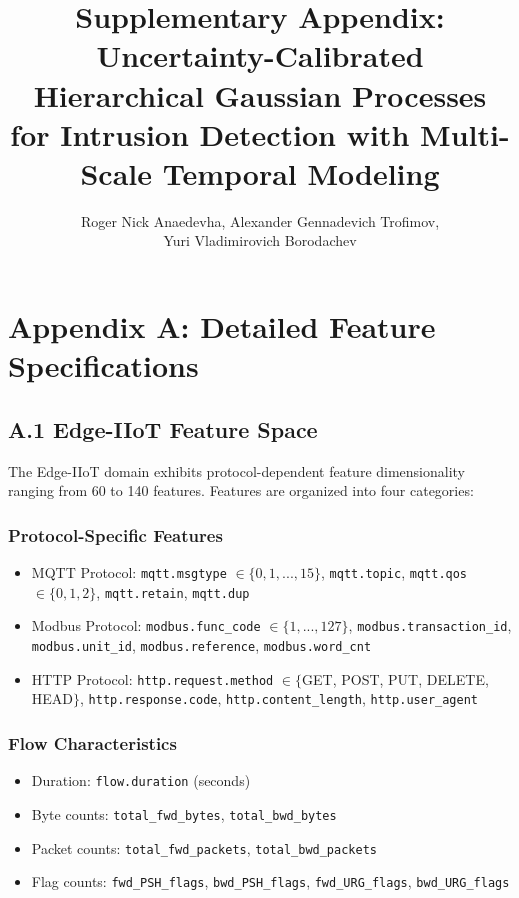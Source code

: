 \documentclass[12pt]{article}
\title{Supplementary Appendix: \\
Uncertainty-Calibrated Hierarchical Gaussian Processes \\
for Intrusion Detection with Multi-Scale Temporal Modeling}
\author{Roger Nick Anaedevha, Alexander Gennadevich Trofimov, \\
Yuri Vladimirovich Borodachev}
\date{}
\begin{document}
\maketitle

\tableofcontents
\newpage

\section{Appendix A: Detailed Feature Specifications}

\subsection{A.1 Edge-IIoT Feature Space}

The Edge-IIoT domain exhibits protocol-dependent feature dimensionality ranging from 60 to 140 features. Features are organized into four categories:

\subsubsection{Protocol-Specific Features}
\begin{itemize}
\item MQTT Protocol: \texttt{mqtt.msgtype} $\in \{0,1,...,15\}$, \texttt{mqtt.topic}, \texttt{mqtt.qos} $\in \{0,1,2\}$, \texttt{mqtt.retain}, \texttt{mqtt.dup}
\item Modbus Protocol: \texttt{modbus.func\_code} $\in \{1,...,127\}$, \texttt{modbus.transaction\_id}, \texttt{modbus.unit\_id}, \texttt{modbus.reference}, \texttt{modbus.word\_cnt}
\item HTTP Protocol: \texttt{http.request.method} $\in \{$GET, POST, PUT, DELETE, HEAD$\}$, \texttt{http.response.code}, \texttt{http.content\_length}, \texttt{http.user\_agent}
\end{itemize}

\subsubsection{Flow Characteristics}
\begin{itemize}
\item Duration: \texttt{flow.duration} (seconds)
\item Byte counts: \texttt{total\_fwd\_bytes}, \texttt{total\_bwd\_bytes}
\item Packet counts: \texttt{total\_fwd\_packets}, \texttt{total\_bwd\_packets}
\item Flag counts: \texttt{fwd\_PSH\_flags}, \texttt{bwd\_PSH\_flags}, \texttt{fwd\_URG\_flags}, \texttt{bwd\_URG\_flags}
\end{itemize}
\end{document}
